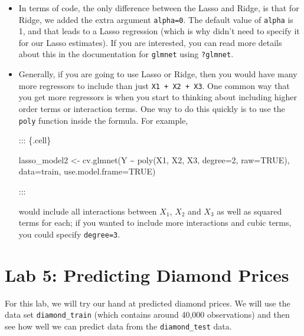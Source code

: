 \documentclass[
  letterpaper,
  DIV=11,
  numbers=noendperiod]{scrreprt}
\newenvironment{Shaded}{\begin{snugshade}}{\end{snugshade}}
\newcommand{\AttributeTok}[1]{\textcolor[rgb]{0.40,0.45,0.13}{#1}}
\newcommand{\ConstantTok}[1]{\textcolor[rgb]{0.56,0.35,0.01}{#1}}
\newcommand{\DecValTok}[1]{\textcolor[rgb]{0.68,0.00,0.00}{#1}}
\newcommand{\FunctionTok}[1]{\textcolor[rgb]{0.28,0.35,0.67}{#1}}
\newcommand{\NormalTok}[1]{\textcolor[rgb]{0.00,0.23,0.31}{#1}}
\newcommand{\OtherTok}[1]{\textcolor[rgb]{0.00,0.23,0.31}{#1}}
\newcommand{\SpecialCharTok}[1]{\textcolor[rgb]{0.37,0.37,0.37}{#1}}
\begin{document}
\begin{itemize}
\item
  In terms of code, the only difference between the Lasso and Ridge, is
  that for Ridge, we added the extra argument \texttt{alpha=0}. The
  default value of \texttt{alpha} is 1, and that leads to a Lasso
  regression (which is why didn't need to specify it for our Lasso
  estimates). If you are interested, you can read more details about
  this in the documentation for \texttt{glmnet} using \texttt{?glmnet}.
\item
  Generally, if you are going to use Lasso or Ridge, then you would have
  many more regressors to include than just \texttt{X1\ +\ X2\ +\ X3}.
  One common way that you get more regressors is when you start to
  thinking about including higher order terms or interaction terms. One
  way to do this quickly is to use the \texttt{poly} function inside the
  formula. For example,

  ::: \{.cell\}

\begin{Shaded}
\begin{Highlighting}[]
\NormalTok{lasso\_model2 }\OtherTok{\textless{}{-}} \FunctionTok{cv.glmnet}\NormalTok{(Y }\SpecialCharTok{\textasciitilde{}} \FunctionTok{poly}\NormalTok{(X1, X2, X3, }\AttributeTok{degree=}\DecValTok{2}\NormalTok{, }\AttributeTok{raw=}\ConstantTok{TRUE}\NormalTok{), }
                          \AttributeTok{data=}\NormalTok{train, }
                          \AttributeTok{use.model.frame=}\ConstantTok{TRUE}\NormalTok{)}
\end{Highlighting}
\end{Shaded}

  :::

  would include all interactions between \(X_1\), \(X_2\) and \(X_3\) as
  well as squared terms for each; if you wanted to include more
  interactions and cubic terms, you could specify \texttt{degree=3}.
\end{itemize}

\section{Lab 5: Predicting Diamond
Prices}\label{lab-5-predicting-diamond-prices}

For this lab, we will try our hand at predicted diamond prices. We will
use the data set \texttt{diamond\_train} (which contains around 40,000
observations) and then see how well we can predict data from the
\texttt{diamond\_test} data.
\end{document}
